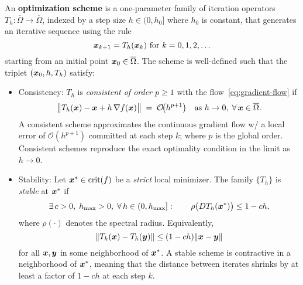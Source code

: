 \documentclass[10pt]{article}
\begin{document}
        \begin{definition}
            An \textbf{optimization scheme} is a one-parameter family of iteration operators
            $T_h : \overline{\Omega} \rightarrow \overline{\Omega}$, indexed by a step size 
            $h \in (0, h_0]$ where $h_0$ is constant, that generates an iterative sequence using the rule
            \begin{equation}
                \label{eq:scheme}
                \bm{x}_{k+1} = T_h(\bm{x}_k) \text{ for } k = 0, 1, 2, \ldots
            \end{equation}
            starting from an initial point $\bm{x}_0 \in \overline{\Omega}$. The scheme is well-defined such that the 
            triplet $(\bm{x}_0, h, T_h)$ satisfy:
            \begin{itemize}
                \item Consistency: $T_{h}$ is \emph{consistent of order $p\!\ge1$} with the flow~\eqref{eq:gradient-flow} if
                    $$
                        \bigl\|T_{h}(\bm{x})-\bm{x}+h\,\nabla f(\bm{x})\bigr\|
                        \;=\;\mathcal{O}\!\bigl(h^{p+1}\bigr)
                        \quad\text{as }h\to0,\;
                        \forall\,\bm{x}\in\overline{\Omega}.
                    $$
                    A consistent scheme approximates the continuous gradient flow w/ a local error of
                    $\mathcal{O}(h^{p+1})$ committed at each step $k$; where $p$ is the global order.
                    Consistent schemes reproduce the exact optimality condition in the limit as $h \to 0$.
                \item Stability: Let $\bm{x}^{*}\in\operatorname{crit}(f)$ be a \emph{strict} local minimizer.
                    The family $\{T_{h}\}$ is \emph{stable} at $\bm{x}^{*}$ if
                    $$
                        \exists\,c>0,\;h_{\max}>0,\;
                        \forall\,h\in(0,h_{\max}]:
                        \qquad
                        \rho\bigl(DT_{h}(\bm{x}^{*})\bigr)\le 1-ch,
                    $$
                    where $\rho(\cdot)$ denotes the spectral radius.  Equivalently,
                    $$
                        \|T_{h}(\bm{x})-T_{h}(\bm{y})\|\le(1-ch)\|\bm{x}-\bm{y}\|
                    $$
                    for all $\bm{x},\bm{y}$ in some neighborhood of $\bm{x}^{*}$.
                    A stable scheme is contractive in a neighborhood of $\bm{x}^{*}$, 
                    meaning that the distance between iterates shrinks by at least a 
                    factor of $1-ch$ at each step $k$.
            \end{itemize}
        \end{definition}
\end{document}
